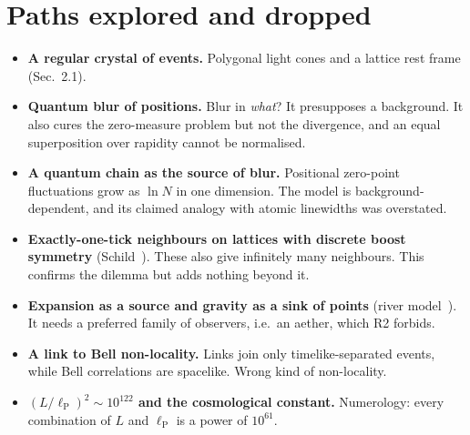 \documentclass[11pt,a4paper]{article}
\newcommand{\lP}{\ell_{\mathrm P}}
\begin{document}
\section{Paths explored and dropped}\label{app:dropped}
\begin{itemize}[leftmargin=*,itemsep=1pt]
\item \textbf{A regular crystal of events.} Polygonal light cones and a lattice rest frame (Sec.~2.1).
\item \textbf{Quantum blur of positions.} Blur in \emph{what}? It presupposes a background. It also cures the zero-measure problem but not the divergence, and an equal superposition over rapidity cannot be normalised.
\item \textbf{A quantum chain as the source of blur.} Positional zero-point fluctuations grow as $\ln N$ in one dimension. The model is background-dependent, and its claimed analogy with atomic linewidths was overstated.
\item \textbf{Exactly-one-tick neighbours on lattices with discrete boost symmetry} (Schild~\cite{Schild48}). These also give infinitely many neighbours. This confirms the dilemma but adds nothing beyond it.
\item \textbf{Expansion as a source and gravity as a sink of points} (river model~\cite{HamiltonLisle08}). It needs a preferred family of observers, i.e.\ an aether, which R2 forbids.
\item \textbf{A link to Bell non-locality.} Links join only timelike-separated events, while Bell correlations are spacelike. Wrong kind of non-locality.
\item \textbf{$(L/\lP)^2\sim10^{122}$ and the cosmological constant.} Numerology: every combination of $L$ and $\lP$ is a power of $10^{61}$.
\end{itemize}
\end{document}
